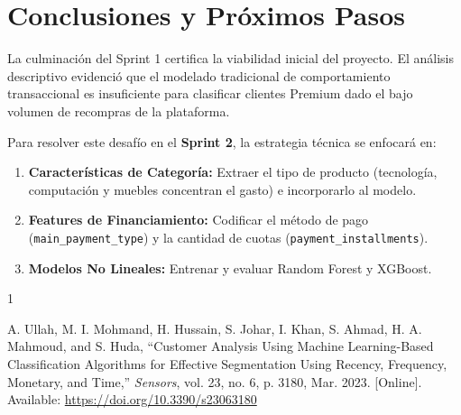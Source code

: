\documentclass[journal,letterpaper]{IEEEtran}
\begin{document}
\section{Conclusiones y Próximos Pasos}
La culminación del Sprint 1 certifica la viabilidad inicial del proyecto. El análisis descriptivo evidenció que el modelado tradicional de comportamiento transaccional es insuficiente para clasificar clientes Premium dado el bajo volumen de recompras de la plataforma.

Para resolver este desafío en el \textbf{Sprint 2}, la estrategia técnica se enfocará en:
\begin{enumerate}
    \item \textbf{Características de Categoría:} Extraer el tipo de producto (tecnología, computación y muebles concentran el gasto) e incorporarlo al modelo.
    \item \textbf{Features de Financiamiento:} Codificar el método de pago (\texttt{main\_payment\_type}) y la cantidad de cuotas (\texttt{payment\_installments}).
    \item \textbf{Modelos No Lineales:} Entrenar y evaluar Random Forest y XGBoost.
\end{enumerate}

\begin{thebibliography}{1}

A. Ullah, M. I. Mohmand, H. Hussain, S. Johar, I. Khan, S. Ahmad, H. A. Mahmoud, and S. Huda, 
``Customer Analysis Using Machine Learning-Based Classification Algorithms for Effective Segmentation Using Recency, Frequency, Monetary, and Time,''
\emph{Sensors}, vol. 23, no. 6, p. 3180, Mar. 2023. [Online]. Available: \url{https://doi.org/10.3390/s23063180}

\end{thebibliography}
\end{document}

